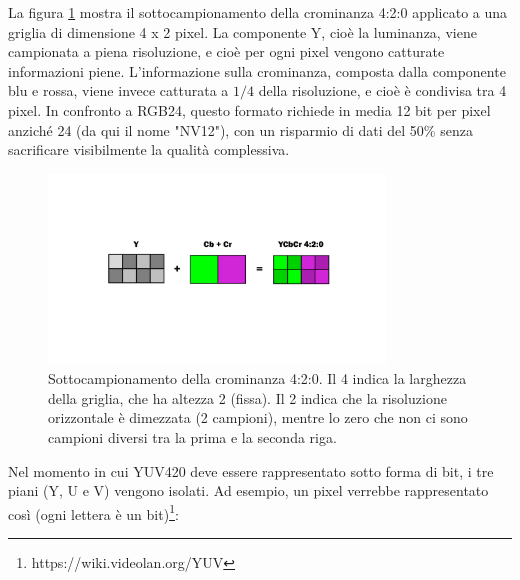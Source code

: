 
La figura \ref{fig:diff_yuv420} mostra il sottocampionamento della crominanza 4:2:0 applicato a una griglia di dimensione 4 x 2 pixel. La componente Y, cioè la luminanza, viene campionata a piena risoluzione, e cioè per ogni pixel vengono catturate informazioni piene. L'informazione sulla crominanza, composta dalla componente blu e rossa\footnotemark{}, viene invece catturata a $1/4$ della risoluzione, e cioè è condivisa tra 4 pixel. In confronto a RGB24, questo formato richiede in media 12 bit per pixel anziché 24 (da qui il nome "NV12"), con un risparmio di dati del 50\% senza sacrificare visibilmente la qualità complessiva.


\begin{figure}[htbp]
	\centering
	
	\includegraphics[width=0.8\textwidth]{res/yuv420.pdf}
	
	\caption{Sottocampionamento della crominanza 4:2:0. Il 4 indica la larghezza della griglia, che ha altezza 2 (fissa). Il 2 indica che la risoluzione orizzontale è dimezzata (2 campioni), mentre lo zero che non ci sono campioni diversi tra la prima e la seconda riga.}
	\label{fig:diff_yuv420}
\end{figure}

Nel momento in cui YUV420 deve essere rappresentato sotto forma di bit, i tre piani (Y, U e V) vengono isolati. Ad esempio, un pixel verrebbe rappresentato così (ogni lettera è un bit)\footnote{https://wiki.videolan.org/YUV}:


